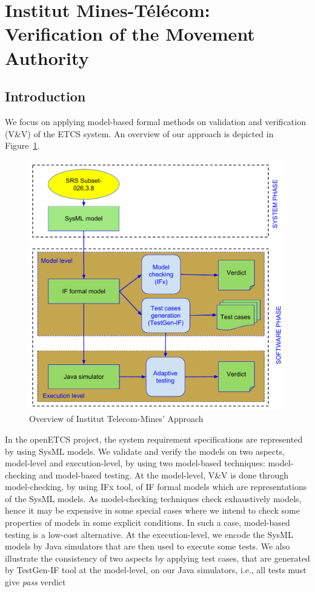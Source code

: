 \documentclass{template/openetcs_article}
\begin{document}
\newpage
\section{Institut Mines-Télécom: Verification of the Movement Authority}

\subsection{Introduction}

We focus on applying model-based formal methods on validation and verification
(V\&V) of the ETCS system.
An overview of our approach is depicted in Figure~\ref{fig:approach}.

\begin{figure}[!htbp]
\begin{center}
  \includegraphics[width=.7\textwidth]{figures/TSP-approach.pdf}
  \caption{Overview of Institut Telecom-Mines' Approach}
  \label{fig:approach}
\end{center}
\end{figure}


In the openETCS project, the system requirement specifications are represented
by using SysML models. We validate and verify the models on two aspects,
model-level and execution-level, by using two model-based techniques:
model-checking and model-based testing.
At the model-level, V\&V is done through model-checking, by using IFx tool, of
IF formal models which are representations of the SysML models.
As model-checking techniques check exhaustively models, hence it may be
expensive in some special cases where we intend to check some properties of
models in some explicit conditions.
In such a case, model-based testing is a low-cost alternative.
At the execution-level, we encode the SysML models by Java simulators that are
then used to execute some tests.
We also illustrate the consistency of two aspects by applying test cases, that
are generated by TestGen-IF tool at the model-level, on our Java simulators,
i.e., all tests must give {\em pass} verdict
\end{document}
